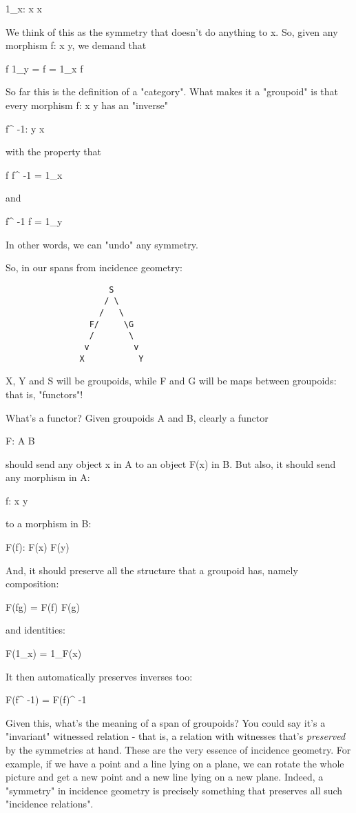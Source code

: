 1_{x}: x \to  x

We think of this as the symmetry that doesn't do anything to x.  
So, given any morphism f: x \to  y, we demand that

f 1_{y} = f = 1_{x} f

So far this is the definition of a "category".  What makes
it a "groupoid" is that every morphism f: x \to  y has an
"inverse"

f^{ -1}: y \to  x

with the property that

f f^{ -1} = 1_{x}

and

f^{ -1} f = 1_{y}

In other words, we can "undo" any symmetry.

So, in our spans from incidence geometry:

\begin{verbatim}
                     S
                    / \
                   /   \
                 F/     \G
                 /       \
                v         v 
               X           Y
\end{verbatim}
    

X, Y and S will be groupoids, while F and G will be maps between 
groupoids: that is, "functors"!

What's a functor?  Given groupoids A and B, clearly a functor 

F: A \to  B

should send any object x in A to an object F(x) in B.  But also, it
should send any morphism in A:

f: x \to  y 

to a morphism in B:

F(f): F(x) \to  F(y)

And, it should preserve all the structure that a groupoid has,
namely composition: 

F(fg) = F(f) F(g)

and identities:

F(1_{x}) = 1_{F(x)}

It then automatically preserves inverses too:

F(f^{ -1}) = F(f)^{ -1}

Given this, what's the meaning of a span of groupoids?  You could say
it's a "invariant" witnessed relation - that is, a relation
with witnesses that's \emph{preserved} by the symmetries at hand.
These are the very essence of incidence geometry.  For example, if we
have a point and a line lying on a plane, we can rotate the whole
picture and get a new point and a new line lying on a new plane.
Indeed, a "symmetry" in incidence geometry is precisely
something that preserves all such "incidence relations".

